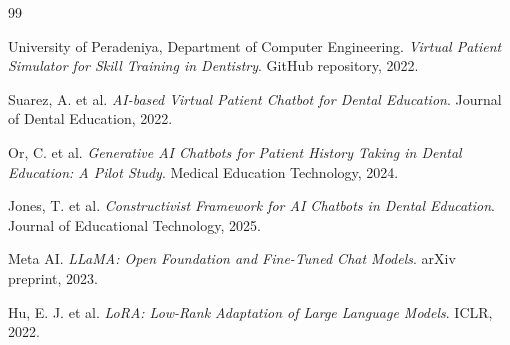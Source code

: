 \documentclass[runningheads,a4paper,11pt]{report}
\begin{document}

\begin{thebibliography}{99}

University of Peradeniya, Department of Computer Engineering.
\textit{Virtual Patient Simulator for Skill Training in Dentistry}.
GitHub repository, 2022.

Suarez, A. et al.
\textit{AI-based Virtual Patient Chatbot for Dental Education}.
Journal of Dental Education, 2022.

Or, C. et al.
\textit{Generative AI Chatbots for Patient History Taking in Dental Education: A Pilot Study}.
Medical Education Technology, 2024.

Jones, T. et al.
\textit{Constructivist Framework for AI Chatbots in Dental Education}.
Journal of Educational Technology, 2025.

Meta AI.
\textit{LLaMA: Open Foundation and Fine-Tuned Chat Models}.
arXiv preprint, 2023.

Hu, E. J. et al.
\textit{LoRA: Low-Rank Adaptation of Large Language Models}.
ICLR, 2022.

\end{thebibliography}
\end{document}
